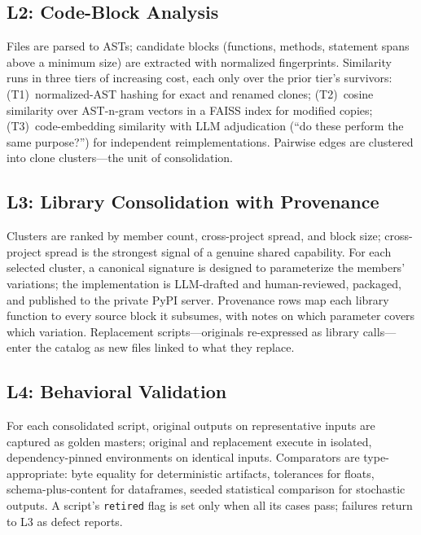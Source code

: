 \documentclass[conference]{IEEEtran}
\begin{document}
\subsection{L2: Code-Block Analysis}
Files are parsed to ASTs; candidate blocks (functions, methods, statement spans above a minimum size) are extracted with normalized fingerprints. Similarity runs in three tiers of increasing cost, each only over the prior tier's survivors: (T1)~normalized-AST hashing for exact and renamed clones; (T2)~cosine similarity over AST-n-gram vectors in a FAISS index for modified copies; (T3)~code-embedding similarity with LLM adjudication (``do these perform the same purpose?'') for independent reimplementations. Pairwise edges are clustered into clone clusters---the unit of consolidation.

\subsection{L3: Library Consolidation with Provenance}
Clusters are ranked by member count, cross-project spread, and block size; cross-project spread is the strongest signal of a genuine shared capability. For each selected cluster, a canonical signature is designed to parameterize the members' variations; the implementation is LLM-drafted and human-reviewed, packaged, and published to the private PyPI server. Provenance rows map each library function to every source block it subsumes, with notes on which parameter covers which variation. Replacement scripts---originals re-expressed as library calls---enter the catalog as new files linked to what they replace.

\subsection{L4: Behavioral Validation}
For each consolidated script, original outputs on representative inputs are captured as golden masters; original and replacement execute in isolated, dependency-pinned environments on identical inputs. Comparators are type-appropriate: byte equality for deterministic artifacts, tolerances for floats, schema-plus-content for dataframes, seeded statistical comparison for stochastic outputs. A script's \texttt{retired} flag is set only when all its cases pass; failures return to L3 as defect reports.
\end{document}

